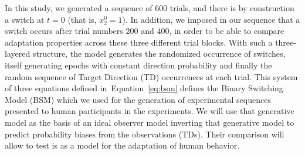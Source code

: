 \documentclass[10pt,letterpaper]{article}
\newcommand{\seeFig}[1]{Figure~\ref{fig:#1}}
\newcommand{\seeEq}[1]{Equation~\ref{eq:#1}}
\begin{document}
In this study, we generated a sequence of $600$ trials,
and there is by construction a switch at $t=0$ (that is, $x_2^0=1$).
In addition, we imposed in our sequence that a switch
occurs after trial numbers $200$ and $400$,
in order to be able to compare adaptation properties
across these three different trial blocks.
With such a three-layered structure, the model generates the randomized occurrence of switches,
itself generating epochs with constant direction probability %
and finally the random sequence of Target Direction (TD) occurrences at each trial.
This system of three equations defined in~\seeEq{bsm}
defines the Binary Switching Model (BSM)
which we used for the generation of experimental sequences presented to human participants in the experiments.
We will use that generative model as the basis of an ideal observer model
inverting that generative model to predict probability biases from the observations (TDs).
Their comparison will allow to test is as a model for the adaptation of human behavior.
\end{document}
